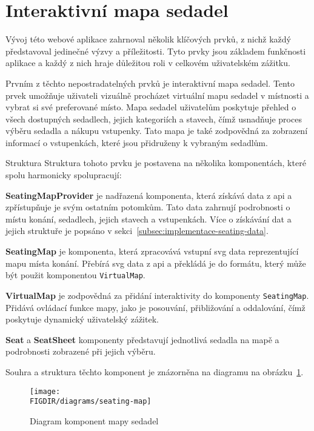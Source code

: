 \section{Interaktivní mapa sedadel}
\label{sec:implementace-seating}
Vývoj této webové aplikace zahrnoval několik klíčových prvků, z nichž každý představoval jedinečné výzvy a příležitosti.
Tyto prvky jsou základem funkčnosti aplikace a každý z nich hraje důležitou roli v celkovém uživatelském zážitku.

Prvním z těchto nepostradatelných prvků je interaktivní mapa sedadel.
Tento prvek umožňuje uživateli vizuálně procházet virtuální mapu sedadel v místnosti a vybrat si své preferované místo.
Mapa sedadel uživatelům poskytuje přehled o všech dostupných sedadlech, jejich kategoriích a stavech, čímž usnadňuje proces výběru sedadla a nákupu vstupenky.
Tato mapa je také zodpovědná za zobrazení informací o vstupenkách, které jsou přidruženy k vybraným sedadlům.

\begin{subsection}{Struktura}
    \label{subsec:implementace-seating-struktura}
    Struktura tohoto prvku je postavena na několika komponentách, které spolu harmonicky spolupracují:

    \textbf{SeatingMapProvider} je nadřazená komponenta, která získává data z \ac{api} a zpřístupňuje je svým ostatním potomkům.
    Tato data zahrnují podrobnosti o místu konání, sedadlech, jejich stavech a vstupenkách.
    Více o získávání dat a jejich struktuře je popsáno v sekci~\ref{subsec:implementace-seating-data}.

    \textbf{SeatingMap} je komponenta, která zpracovává vstupní \ac{svg} data reprezentující mapu místa konání.
    Přebírá \ac{svg} data z \ac{api} a překládá je do formátu, který může být použit komponentou \texttt{VirtualMap}.

    \textbf{VirtualMap} je zodpovědná za přidání interaktivity do komponenty \texttt{SeatingMap}.
    Přidává ovládací funkce mapy, jako je posouvání, přibližování a oddalování, čímž poskytuje dynamický uživatelský zážitek.

    \textbf{Seat} a \textbf{SeatSheet} komponenty představují jednotlivá sedadla na mapě a podrobnosti zobrazené při jejich výběru.

    Souhra a struktura těchto komponent je znázorněna na diagramu na obrázku~\ref{fig:seating-map-structure}.

    \begin{figure}[H]
        \centering
        \caption{Diagram komponent mapy sedadel}
        \texttt{[image: \\FIGDIR/diagrams/seating-map]}
        \source{}
        \label{fig:seating-map-structure}
    \end{figure}
\end{subsection}

